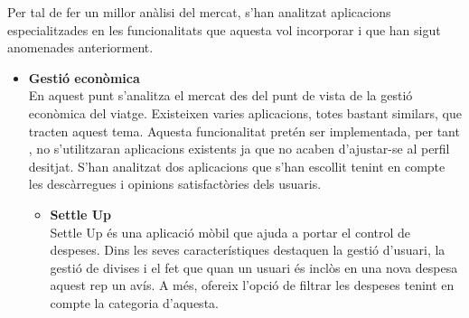 Per tal de fer un millor anàlisi del mercat, s’han analitzat aplicacions especialitzades en les funcionalitats que aquesta vol incorporar i que han sigut anomenades anteriorment.

\begin{itemize}
\item{\textbf{Gestió econòmica}}\\
En aquest punt s’analitza el mercat des del punt de vista de la gestió econòmica del viatge. Existeixen varies aplicacions, totes bastant similars, que tracten aquest tema.
Aquesta funcionalitat pretén ser implementada, per tant , no s’utilitzaran aplicacions existents ja que no acaben d’ajustar-se al perfil desitjat.
S’han analitzat dos aplicacions que s’han escollit tenint en compte les descàrregues i opinions satisfactòries dels usuaris.
\begin{itemize}
\item{\textbf{Settle Up}}\\
Settle Up és una aplicació mòbil que ajuda a portar el control de despeses. Dins les seves característiques destaquen la gestió d’usuari, la gestió de divises i el fet que quan un usuari és inclòs en una nova despesa aquest rep un avís. A més, ofereix l’opció de filtrar les despeses tenint en compte la categoria d’aquesta.


\end{itemize}
\end{itemize}
